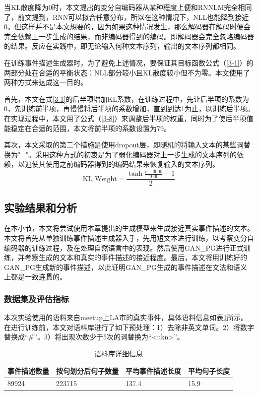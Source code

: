 当KL散度降为0时，本文提出的变分自编码器从某种程度上便和RNNLM完全相同了，前文提到，RNN可以拟合任意分布，所以在这种情况下，NLL也能降到接近0。但这样并不是本文想要的，因为如果这种情况发生，那么解码器在解码时便会完全依赖上一步生成的结果，而非编码器得到的编码。即解码器会完全忽略编码器的结果。反应在实践中，即无论输入何种文本序列，输出的文本序列都相同。

在训练事件描述生成器时，为了避免上述情况，要保证其目标函数公式（\ref{3-1}）的两部分处在合适的平衡状态：NLL部分较小且KL散度较小但不为零。本文使用了两种方式来达成这一目的。

首先，本文在式\ref{3-1}的后半项增加KL系数，在训练过程中，先让后半项的系数为0，先训练前半项，再慢慢将后半项的系数增加，直到到达1为止，以训练后半项。在实现过程中，本文用了公式（\ref{3-8}）来调整后半项的权重，同时为了使后半项值能稳定在合适的范围，本文将前半项的系数设置为79。

其次，本文采取的第二个措施是使用dropout层，即随机的将输入文本的某些词替换为"\_"。采用这种方式的初衷是为了弱化编码器对上一步生成的文本序列的依赖，以迫使其使用之前编码器得到的编码结果来恢复输入的文本序列。
\begin{equation}\label{3-8}
    \mathrm{KL\_Weight}=\frac{\tanh\frac{i-3000}{1000}+1}{2}
\end{equation}

\subsection{实验结果和分析}
在本小节，本文将尝试使用本章提出的生成模型来生成接近真实事件描述的文本。本文将首先从单独训练事件描述生成器入手，先用短文本进行训练，以考察变分自编码器的训练过程，及在处理自然语言中的表现。然后使用GAN\_PG进行正式训练，并考察生成的文本和真实的事件描述的接近程度。最后，本文将用训练好的GAN\_PG生成新的事件描述，以此证明GAN\_PG生成的事件描述在文法和语义上都是一致连贯的。
\subsubsection{数据集及评估指标}
本次实验使用的语料来自meetup上LA市的真实事件，具体语料信息如表\ref{t3-1}所示。在进行训练前，本文对语料库进行了如下预处理：1）去除非英文单词。2）将数字替换成“\#”。3）将出现次数少于5次的词替换为“<ukn>”。
\begin{table}[htb]
    \caption{\label{t3-1} 语料库详细信息}
    \center
    \begin{tabular*}{\linewidth}{p{.25\linewidth}p{.25\linewidth}p{.25\linewidth}p{.25\linewidth}}
    \toprule
    事件描述数量&按句划分后句子数量&平均事件描述长度&平均句子长度 \\
    \midrule 
    89924&223715&137.4&15.9 \\
    \bottomrule 
    \end{tabular*}
\end{table}

